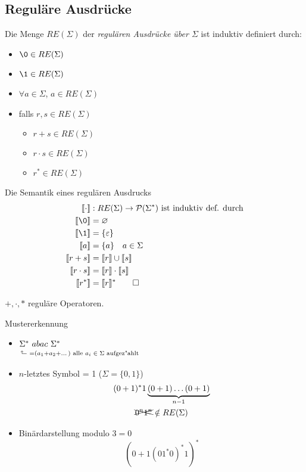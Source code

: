 \subsection{Reguläre Ausdrücke}
\begin{Def}[name={[RE($\Sigma$)]}]
	Die Menge $RE(\Sigma)$ der \emph{regulären Ausdrücke über $\Sigma$} ist induktiv definiert durch:
	\begin{itemize}
	\item $\0\in RE(\Sigma)$
	\item $\1\in RE(\Sigma)$
	\item $\forall a\in\Sigma$, $a\in RE(\Sigma)$
	\item falls $r,s\in RE(\Sigma)$
		\begin{itemize}[label=\textbullet]
		\item $r+s\in RE(\Sigma)$
		\item $r\cdot s\in RE(\Sigma)$
		\item $r^*\in RE(\Sigma)$
		\end{itemize}
	\end{itemize}
\end{Def}
\begin{Def}[name={[Semantik eines regulären Ausdrucks]}]
	Die Semantik eines regulären Ausdrucks
	\begin{align*}
		\llbracket\cdot \rrbracket &: RE(\Sigma) \-> \mathcal{P}(\Sigma^*)\text{ ist induktiv def. durch}\\
		\llbracket \0 \rrbracket &= \varnothing\\
		\llbracket \1 \rrbracket &= \{\Eps\}\\
		\llbracket a \rrbracket &= \{a\} \quad a\in\Sigma\\
		\llbracket r+s \rrbracket &= \llbracket r\rrbracket \cup \llbracket s\rrbracket\\
		\llbracket r\cdot s \rrbracket &= \llbracket r\rrbracket \cdot \llbracket s\rrbracket\\
		\llbracket r^* \rrbracket &= \llbracket r\rrbracket^* \qedhere
	\end{align*}
\end{Def}
$+,\cdot ,*$ reguläre Operatoren.\\
%
\begin{minipage}[t]{.5\textwidth}
    \begin{Bsp*} Mustererkennung
    	\begin{itemize}
    	\item $\underset{\vphantom{\big(}\mathrlap{\hspace{-4pt}\rotatebox[origin=c]{90}{$\Rsh$}\ =(a_1+a_2+\dots) \text{ alle $a_i\in\Sigma$ aufgez"ahlt}}}{\Sigma^*}\ abac\ \Sigma^*$
    	\item $n$-letztes Symbol = 1 ($\Sigma=\{0,1\}$)
    	\begin{gather*}
    	(0+1)^*1\underbrace{(0+1)\dots(0+1)}_{n-1}\\
    	\xcancel{0^n1^n}\notin RE(\Sigma)
    	\end{gather*}
    	\item Binärdarstellung modulo $3=0$
    	\[ (0+1(01^*0)^*1)^* \]
    	\end{itemize}
    \end{Bsp*}
\end{minipage}%
